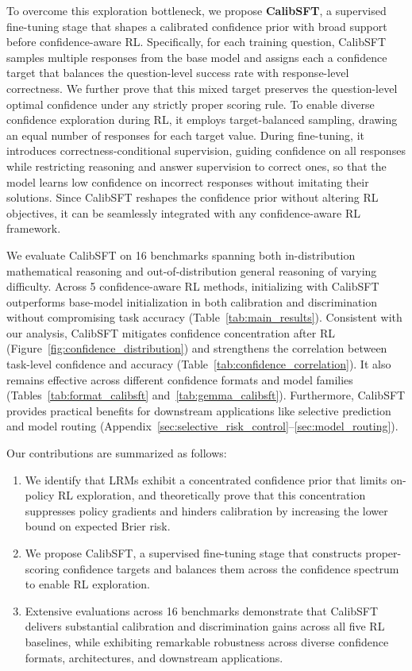 \documentclass{article} %
\begin{document}
To overcome this exploration bottleneck, we propose \textbf{CalibSFT}, a supervised fine-tuning stage that shapes a calibrated confidence prior with broad support before confidence-aware RL.
Specifically, for each training question, CalibSFT samples multiple responses from the base model and assigns each a confidence target that balances the question-level success rate with response-level correctness.
We further prove that this mixed target preserves the question-level optimal confidence under any strictly proper scoring rule.
To enable diverse confidence exploration during RL, it employs target-balanced sampling, drawing an equal number of responses for each target value.
During fine-tuning, it introduces correctness-conditional supervision, guiding confidence on all responses while restricting reasoning and answer supervision to correct ones, so that the model learns low confidence on incorrect responses without imitating their solutions.
Since CalibSFT reshapes the confidence prior without altering RL objectives, it can be seamlessly integrated with any confidence-aware RL framework.

We evaluate CalibSFT on 16 benchmarks spanning both in-distribution mathematical reasoning and out-of-distribution general reasoning of varying difficulty.
Across 5 confidence-aware RL methods, initializing with CalibSFT outperforms base-model initialization in both calibration and discrimination without compromising task accuracy (Table~\ref{tab:main_results}).
Consistent with our analysis, CalibSFT mitigates confidence concentration after RL (Figure~\ref{fig:confidence_distribution}) and strengthens the correlation between task-level confidence and accuracy (Table~\ref{tab:confidence_correlation}).
It also remains effective across different confidence formats and model families (Tables~\ref{tab:format_calibsft} and~\ref{tab:gemma_calibsft}).
Furthermore, CalibSFT provides practical benefits for downstream applications like selective prediction and model routing (Appendix~\ref{sec:selective_risk_control}--\ref{sec:model_routing}).

Our contributions are summarized as follows:
\begin{enumerate}[leftmargin=2em,itemsep=1pt,topsep=1pt]
    \item We identify that LRMs exhibit a concentrated confidence prior that limits on-policy RL exploration, and theoretically prove that this concentration suppresses policy gradients and hinders calibration by increasing the lower bound on expected Brier risk.
    \item We propose CalibSFT, a supervised fine-tuning stage that constructs proper-scoring confidence targets and balances them across the confidence spectrum to enable RL exploration.
    \item Extensive evaluations across 16 benchmarks demonstrate that CalibSFT delivers substantial calibration and discrimination gains across all five RL baselines, while exhibiting remarkable robustness across diverse confidence formats, architectures, and downstream applications.
\end{enumerate}
\end{document}
